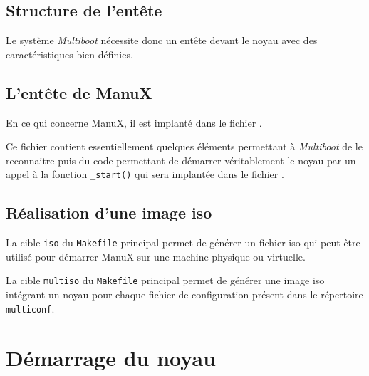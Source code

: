 %
\subsection{Structure de l'entête}

   Le système {\em Multiboot} nécessite donc un entête devant le noyau
avec des caractéristiques bien définies.


%
\subsection{L'entête de ManuX}

   En ce qui concerne ManuX, il est
implanté dans le fichier .

   Ce fichier contient essentiellement quelques éléments permettant à
{\em Multiboot} de le reconnaitre puis du code permettant de démarrer
véritablement le noyau par un appel à la fonction \lstinline!_start()!
qui sera implantée dans le fichier .

%
\subsection{Réalisation d'une image {\sc iso}}

   La cible {\tt iso}  du {\tt Makefile} principal permet de générer
un fichier {\sc iso} qui peut être utilisé pour démarrer ManuX sur une
machine physique ou virtuelle.

   La cible {\tt multiso} du {\tt Makefile} principal permet de
générer une image {\sc iso} intégrant un noyau pour chaque fichier de
configuration présent dans le répertoire {\tt multiconf}.

%
\section{Démarrage du noyau}

